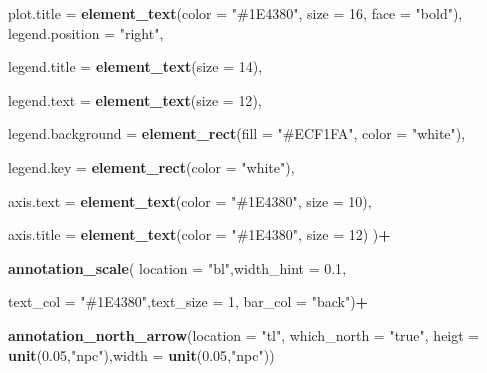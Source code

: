 \documentclass[
]{article}
\newenvironment{Shaded}{\begin{snugshade}}{\end{snugshade}}
\newcommand{\AttributeTok}[1]{\textcolor[rgb]{0.13,0.29,0.53}{#1}}
\newcommand{\DecValTok}[1]{\textcolor[rgb]{0.00,0.00,0.81}{#1}}
\newcommand{\FloatTok}[1]{\textcolor[rgb]{0.00,0.00,0.81}{#1}}
\newcommand{\FunctionTok}[1]{\textcolor[rgb]{0.13,0.29,0.53}{\textbf{#1}}}
\newcommand{\NormalTok}[1]{#1}
\newcommand{\SpecialCharTok}[1]{\textcolor[rgb]{0.81,0.36,0.00}{\textbf{#1}}}
\newcommand{\StringTok}[1]{\textcolor[rgb]{0.31,0.60,0.02}{#1}}
\begin{document}
\begin{Shaded}
\begin{Highlighting}[]
    \AttributeTok{plot.title =} \FunctionTok{element\_text}\NormalTok{(}\AttributeTok{color =} \StringTok{"\#1E4380"}\NormalTok{, }\AttributeTok{size =} \DecValTok{16}\NormalTok{, }\AttributeTok{face =} \StringTok{"bold"}\NormalTok{),}
    \AttributeTok{legend.position =} \StringTok{"right"}\NormalTok{,}
    
    \AttributeTok{legend.title =} \FunctionTok{element\_text}\NormalTok{(}\AttributeTok{size =} \DecValTok{14}\NormalTok{),}
    
    \AttributeTok{legend.text =} \FunctionTok{element\_text}\NormalTok{(}\AttributeTok{size =} \DecValTok{12}\NormalTok{),}
    
    \AttributeTok{legend.background =} \FunctionTok{element\_rect}\NormalTok{(}\AttributeTok{fill =} \StringTok{"\#ECF1FA"}\NormalTok{, }\AttributeTok{color =} \StringTok{"white"}\NormalTok{),}
    
    \AttributeTok{legend.key =} \FunctionTok{element\_rect}\NormalTok{(}\AttributeTok{color =} \StringTok{"white"}\NormalTok{),}
    
    \AttributeTok{axis.text =} \FunctionTok{element\_text}\NormalTok{(}\AttributeTok{color =} \StringTok{"\#1E4380"}\NormalTok{, }\AttributeTok{size =} \DecValTok{10}\NormalTok{),}
    
    \AttributeTok{axis.title =} \FunctionTok{element\_text}\NormalTok{(}\AttributeTok{color =} \StringTok{"\#1E4380"}\NormalTok{, }\AttributeTok{size =} \DecValTok{12}\NormalTok{)}
\NormalTok{  )}\SpecialCharTok{+}
  
  \FunctionTok{annotation\_scale}\NormalTok{( }\AttributeTok{location =} \StringTok{"bl"}\NormalTok{,}\AttributeTok{width\_hint =} \FloatTok{0.1}\NormalTok{,}
                    
  \AttributeTok{text\_col =} \StringTok{"\#1E4380"}\NormalTok{,}\AttributeTok{text\_size =} \DecValTok{1}\NormalTok{, }\AttributeTok{bar\_col =} \StringTok{"back"}\NormalTok{)}\SpecialCharTok{+}
  
    \FunctionTok{annotation\_north\_arrow}\NormalTok{(}\AttributeTok{location =} \StringTok{"tl"}\NormalTok{, }\AttributeTok{which\_north =} \StringTok{"true"}\NormalTok{,}
                         \AttributeTok{heigt =} \FunctionTok{unit}\NormalTok{(}\FloatTok{0.05}\NormalTok{,}\StringTok{"npc"}\NormalTok{),}\AttributeTok{width =} \FunctionTok{unit}\NormalTok{(}\FloatTok{0.05}\NormalTok{,}\StringTok{"npc"}\NormalTok{))}
\end{Highlighting}
\end{Shaded}
\end{document}
